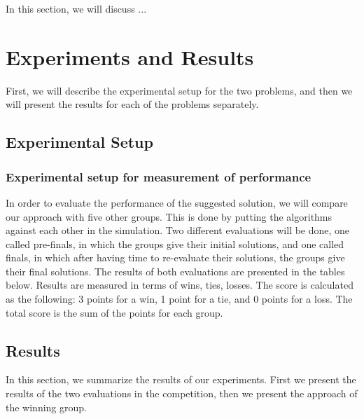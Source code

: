 \documentclass[a4paper,12pt]{article}
\begin{document}
In this section, we will discuss ...





\section{Experiments and Results}
\label{sec:experiments_and_results}

First, we will describe the experimental setup for the two problems, and then we will present the results for each of the problems separately.

\subsection{Experimental Setup}
\label{subsec:experimental_setup}

\subsubsection{Experimental setup for measurement of performance}
In order to evaluate the performance of the suggested solution, we will compare our approach with five other groups. 
This is done by putting the algorithms against each other in the simulation. 
Two different evaluations will be done, one called pre-finals, in which the groups give their initial solutions, and one called finals, in which after having time to re-evaluate their solutions, the groups give their final solutions.
The results of both evaluations are presented in the tables below.
Results are measured in terms of wins, ties, losses. The score is calculated as the following: 3 points for a win, 1 point for a tie, and 0 points for a loss. The total score is the sum of the points for each group.




\subsection{Results}
\label{subsec:results}
In this section, we summarize the results of our experiments. First we present the results of the two evaluations in the competition, then we present the approach of the winning group.

\end{document}
